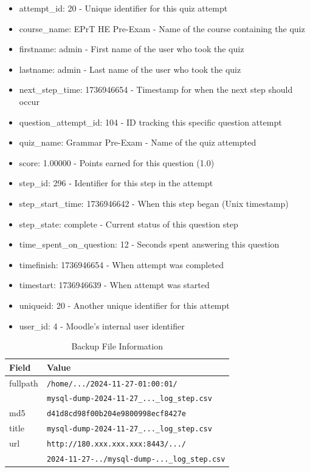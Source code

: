 \begin{itemize}
    \item attempt\_id: 20 - Unique identifier for this quiz attempt
    \item course\_name: EPrT HE Pre-Exam - Name of the course containing the quiz
    \item firstname: admin - First name of the user who took the quiz
    \item lastname: admin - Last name of the user who took the quiz
    \item next\_step\_time: 1736946654 - Timestamp for when the next step should occur
    \item question\_attempt\_id: 104 - ID tracking this specific question attempt
    \item quiz\_name: Grammar Pre-Exam - Name of the quiz attempted
    \item score: 1.00000 - Points earned for this question (1.0)
    \item step\_id: 296 - Identifier for this step in the attempt
    \item step\_start\_time: 1736946642 - When this step began (Unix timestamp)
    \item step\_state: complete - Current status of this question step
    \item time\_spent\_on\_question: 12 - Seconds spent answering this question
    \item timefinish: 1736946654 - When attempt was completed
    \item timestart: 1736946639 - When attempt was started
    \item uniqueid: 20 - Another unique identifier for this attempt
    \item user\_id: 4 - Moodle's internal user identifier
\end{itemize}



\begin{table}[h]
\centering
\caption{Backup File Information}
\label{tab:backup_info}
\small
\begin{tabular}{|p{1.3cm}|p{6.5cm}|}
\hline
\textbf{Field} & \textbf{Value} \\ \hline
fullpath & \texttt{\scriptsize /home/.../2024-11-27-01:00:01/} \\ 
           & \texttt{\scriptsize mysql-dump-2024-11-27\_...\_log\_step.csv} \\ \hline
md5 & \texttt{\footnotesize d41d8cd98f00b204e9800998ecf8427e} \\ \hline
title & \texttt{\footnotesize mysql-dump-2024-11-27\_...\_log\_step.csv} \\ \hline
url & \texttt{\scriptsize http://180.xxx.xxx.xxx:8443/.../} \\
    & \texttt{\scriptsize 2024-11-27-../mysql-dump-...\_log\_step.csv} \\ \hline
\end{tabular}
\end{table}

